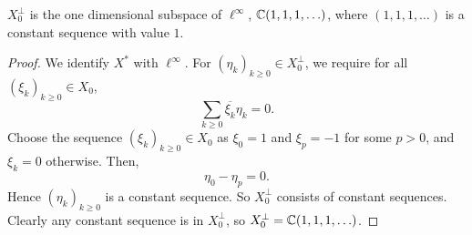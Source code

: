 \documentclass{unswmaths}
\begin{document}
\begin{theorem}
    $X_0^\perp$ is the one dimensional subspace of $\ell^\infty$, $\mathbb{C}(1,1,1,\ldots)$, where $(1,1,1,\ldots)$
    is a constant sequence with value $1$.
\end{theorem}
\begin{proof}
    We identify $X^*$ with $\ell^\infty$. For $(\eta_k)_{k\geq 0} \in X_0^\perp$, we require for all $(\xi_k)_{k\geq 0} \in X_0$,
    \begin{equation*}
        \sum_{k\geq 0} \overline{\xi_k} {\eta_k} = 0.
    \end{equation*}
    Choose the sequence $(\xi_k)_{k\geq 0} \in X_0$ as $\xi_0 = 1$ and $\xi_p = -1$ for some $p > 0$,
    and $\xi_k = 0$ otherwise. Then,
    \begin{equation*}
        \eta_0 - \eta_p = 0.
    \end{equation*}
    Hence $(\eta_k)_{k\geq 0}$ is a constant sequence. So $X_0^\perp$ consists of constant sequences. Clearly
    any constant sequence is in $X_0^\perp$, so $X_0^\perp = \mathbb{C}(1,1,1,\ldots)$.
\end{proof}
\end{document}
